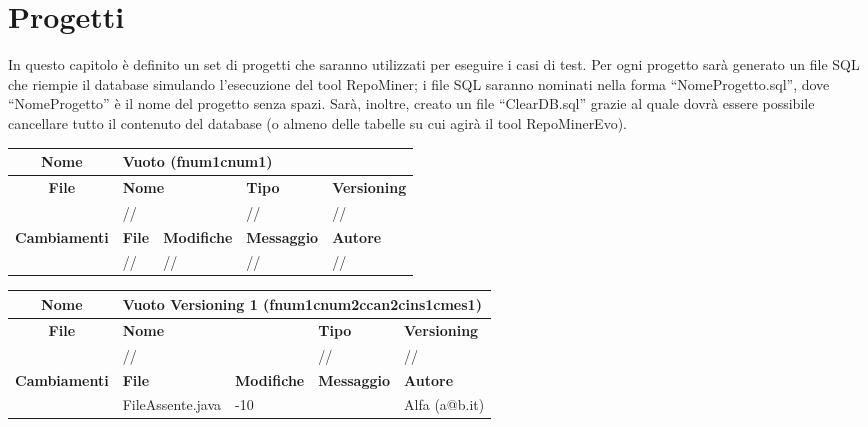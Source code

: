 \chapter{Progetti}
In questo capitolo è definito un set di progetti che saranno utilizzati per eseguire i casi di test. Per ogni progetto sarà generato un file SQL che riempie il database simulando l'esecuzione del tool RepoMiner; i file SQL saranno nominati nella forma ``NomeProgetto.sql'', dove ``NomeProgetto'' è il nome del progetto senza spazi. Sarà, inoltre, creato un file ``ClearDB.sql'' grazie al quale dovrà essere possibile cancellare tutto il contenuto del database (o almeno delle tabelle su cui agirà il tool RepoMinerEvo).

\begin{table}[ht]
\footnotesize
\begin{tabular}{|c|p{2.5cm}|p{2cm}|p{2.5cm}|p{2.5cm}|}
  \hline
  \textbf{Nome}	& \multicolumn{4}{l|}{Vuoto (fnum1cnum1)} 												\\
  \hline
  \rowcolor{lightgray}\textbf{File} 		& \multicolumn{2}{l|}{\textbf{Nome}}		& \textbf{Tipo}		& \textbf{Versioning} 		\\
						\cline{2-5}
						& \multicolumn{2}{l|}{//}			& //			& //				\\
  \hline
  \rowcolor{lightgray}\textbf{Cambiamenti}	& \textbf{File}		&\textbf{Modifiche}	& \textbf{Messaggio}	& \textbf{Autore}		\\
						\cline{2-5}
						& //			& //  			& //			& //				\\
  \hline
\end{tabular}
\end{table}

\begin{table}[ht]
\footnotesize
\begin{tabular}{|c|p{2.5cm}|p{2cm}|p{2.5cm}|p{2.5cm}|}
  \hline
  \textbf{Nome}	& \multicolumn{4}{l|}{Vuoto Versioning 1 (fnum1cnum2ccan2cins1cmes1)} 									\\
  \hline
  \rowcolor{lightgray}\textbf{File} 		& \multicolumn{2}{l|}{\textbf{Nome}}		& \textbf{Tipo}		& \textbf{Versioning} 		\\
						\cline{2-5}
						& \multicolumn{2}{l|}{//}			& //			& //				\\
  \hline
  \rowcolor{lightgray}\textbf{Cambiamenti}	& \textbf{File}		&\textbf{Modifiche}	& \textbf{Messaggio}	& \textbf{Autore}		\\
						\cline{2-5}
						& FileAssente.java	& -10	  		& 			& Alfa (a@b.it)			\\
  \hline
\end{tabular}
\end{table}

